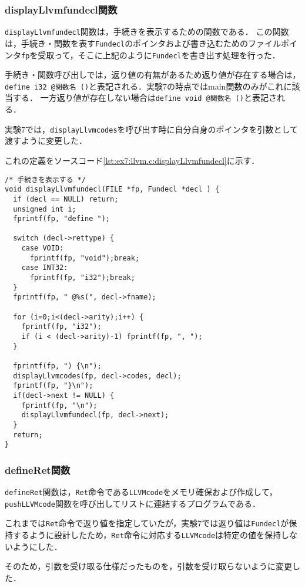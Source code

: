 \documentclass[uplatex]{jsarticle}
\begin{document}
\subsubsection{displayLlvmfundecl関数}
\verb#displayLlvmfundecl#関数は，手続きを表示するための関数である．
この関数は，手続き・関数を表す\verb#Fundecl#のポインタおよび書き込むためのファイルポインタ\verb#fp#を受取って，そこに上記のように\verb#Fundecl#を書き出す処理を行った．

手続き・関数呼び出しでは，返り値の有無があるため返り値が存在する場合は，
\verb#define i32 @関数名 ()#と表記される．実験7の時点ではmain関数のみがこれに該当する．
一方返り値が存在しない場合は\verb#define void @関数名 ()#と表記される．

実験7では，\verb#displayLlvmcodes#を呼び出す時に自分自身のポインタを引数として渡すように変更した．

これの定義をソースコード\ref{lst:ex7:llvm.c:displayLlvmfundecl}に示す．

\begin{lstlisting}[caption=displayLlvmfundecl関数の定義,label=lst:ex7:llvm.c:displayLlvmfundecl]
/* 手続きを表示する */
void displayLlvmfundecl(FILE *fp, Fundecl *decl ) {
  if (decl == NULL) return;
  unsigned int i;
  fprintf(fp, "define ");

  switch (decl->rettype) {
    case VOID:
      fprintf(fp, "void");break;
    case INT32:
      fprintf(fp, "i32");break;
  }
  fprintf(fp, " @%s(", decl->fname);

  for (i=0;i<(decl->arity);i++) {
    fprintf(fp, "i32");
    if (i < (decl->arity)-1) fprintf(fp, ", ");
  }

  fprintf(fp, ") {\n");
  displayLlvmcodes(fp, decl->codes, decl);
  fprintf(fp, "}\n");
  if(decl->next != NULL) {
    fprintf(fp, "\n");
    displayLlvmfundecl(fp, decl->next);
  }
  return;
}
\end{lstlisting}

\subsubsection{defineRet関数}
\verb#defineRet#関数は，\verb#Ret#命令である\verb#LLVMcode#をメモリ確保および作成して，\verb#pushLLVMcode#関数を呼び出してリストに連結するプログラムである．

これまでは\verb#Ret#命令で返り値を指定していたが，実験7では返り値は\verb#Fundecl#が保持するように設計したため，\verb#Ret#命令に対応する\verb#LLVMcode#は特定の値を保持しないようにした．

そのため，引数を受け取る仕様だったものを，引数を受け取らないように変更した．
\end{document}
